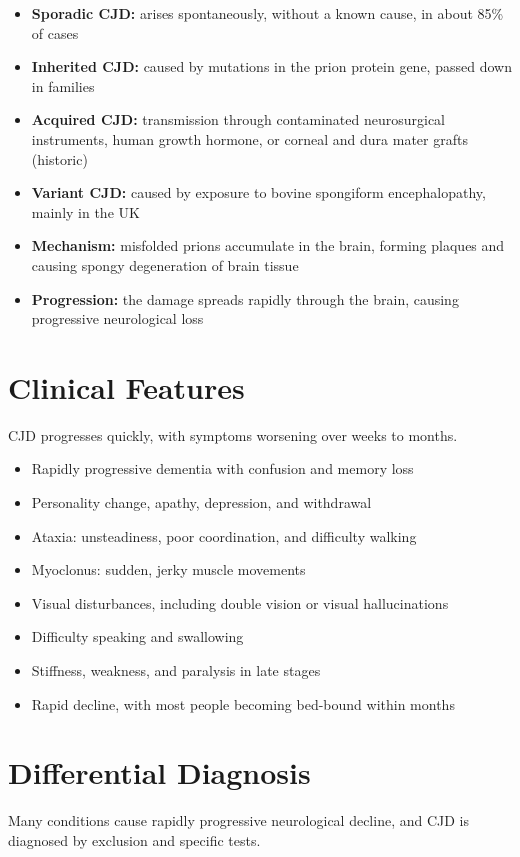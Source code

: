 \begin{itemize}
    \item \textbf{Sporadic CJD:} arises spontaneously, without a known cause, in about 85\% of cases
    \item \textbf{Inherited CJD:} caused by mutations in the prion protein gene, passed down in families
    \item \textbf{Acquired CJD:} transmission through contaminated neurosurgical instruments, human growth hormone, or corneal and dura mater grafts (historic)
    \item \textbf{Variant CJD:} caused by exposure to bovine spongiform encephalopathy, mainly in the UK
    \item \textbf{Mechanism:} misfolded prions accumulate in the brain, forming plaques and causing spongy degeneration of brain tissue
    \item \textbf{Progression:} the damage spreads rapidly through the brain, causing progressive neurological loss
\end{itemize}

\section*{Clinical Features}
CJD progresses quickly, with symptoms worsening over weeks to months.

\begin{itemize}
    \item Rapidly progressive dementia with confusion and memory loss
    \item Personality change, apathy, depression, and withdrawal
    \item Ataxia: unsteadiness, poor coordination, and difficulty walking
    \item Myoclonus: sudden, jerky muscle movements
    \item Visual disturbances, including double vision or visual hallucinations
    \item Difficulty speaking and swallowing
    \item Stiffness, weakness, and paralysis in late stages
    \item Rapid decline, with most people becoming bed-bound within months
\end{itemize}

\section*{Differential Diagnosis}
Many conditions cause rapidly progressive neurological decline, and CJD is diagnosed by exclusion and specific tests.

